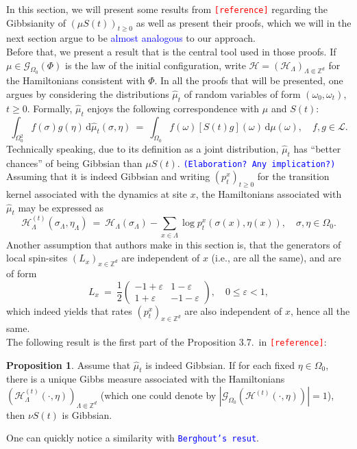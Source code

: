 \documentclass[12pt]{article}
\renewcommand{\d}{\mathrm{d}}
\newcommand{\G}{\mathcal{G}}
\renewcommand{\H}{\mathcal{H}}
\newcommand{\Loc}{\mathcal{L}}
\newcommand{\Z}{\mathbb{Z}}
\newcommand{\pika}{\boldsymbol{\cdot}}
\newcommand{\1}{\mathbbm{1}}
\newcommand{\5}{\vspace{0.5cm}}
\renewcommand{\hat}{\widehat}
\theoremstyle{definition}
\newtheorem{prop}[thm]{Proposition}
\begin{document}
In this section, we will present some results from \textcolor{red}{\texttt{[reference]}} regarding the Gibbsianity of $(\mu S(t))_{t\geq 0}$ as well as present their proofs, which we will in the next section argue to be \textcolor{blue}{almost analogous} to our approach. \\

Before that, we present a result that is the central tool used in those proofs. If $\mu\in\G_{\Omega_0}(\Phi)$ is the law of the initial configuration, write $\H=(\H_\Lambda)_{\Lambda\Subset\Z^d}$ for the Hamiltonians consistent with $\Phi$. In all the proofs that will be presented, one argues by considering the distributions $\hat{\mu}_t$ of random variables of form $(\omega_0,\omega_t)$, $t\geq 0$. Formally, $\hat{\mu}_t$ enjoys the following correspondence with $\mu$ and $S(t)$:
$$\int_{\Omega_0^2} f(\sigma)g(\eta)\,\d\hat{\mu}_t(\sigma,\eta) ~=~ \int_{\Omega_0}f(\omega)[S(t)g](\omega)\,\d\mu(\omega), \quad f,g\in\Loc.$$
Technically speaking, due to its definition as a joint distribution, $\hat{\mu}_t$ has ``better chances'' of being Gibbsian than $\mu S(t)$. \textcolor{blue}{\texttt{(Elaboration? Any implication?)}} Assuming that it is indeed Gibbsian and writing $(p_t^x)_{t\geq 0}$ for the transition kernel associated with the dynamics at site $x$, the Hamiltonians associated with $\hat{\mu}_t$ may be expressed as
$$\H_\Lambda^{(t)}(\sigma_\Lambda,\eta_\Lambda) ~=~ \H_\Lambda(\sigma_\Lambda) - \sum_{x\in\Lambda}\log p_t^x(\sigma(x),\eta(x)), \quad \sigma,\eta\in\Omega_0.$$
Another assumption that authors make in this section is, that the generators of local spin-sites $(L_x)_{x\in\Z^d}$ are independent of $x$ (i.e., are all the same), and are of form
$$L_x ~=~ \frac{1}{2}\begin{pmatrix}
-1+\varepsilon & 1-\varepsilon \\
1+\varepsilon & -1-\varepsilon
\end{pmatrix}, \quad 0\leq \varepsilon<1,$$
which indeed yields that rates $(p_t^x)_{x\in\Z^d}$ are also independent of $x$, hence all the same.\\

The following result is the first part of the Proposition 3.7.~in \textcolor{red}{\texttt{[reference]}}:
\begin{prop}
Assume that $\hat{\mu}_t$ is indeed Gibbsian. If for each fixed $\eta\in\Omega_0$, there is a unique Gibbs measure associated with the Hamiltonians $(\H_\Lambda^{(t)}(\pika,\eta))_{\Lambda\Subset\Z^d}$ (which one could denote by $|\G_{\Omega_0}(\H^{(t)}(\pika,\eta))|=1$), then $\nu S(t)$ is Gibbsian.
\end{prop}
One can quickly notice a similarity with \textcolor{blue}{\texttt{Berghout's resut}}. \\
\end{document}
